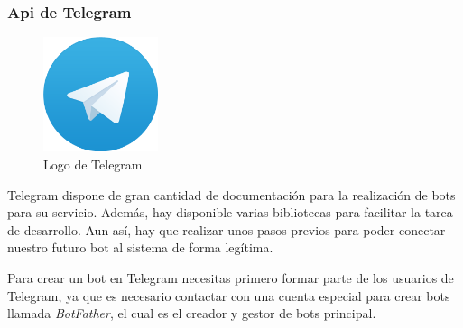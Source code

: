 \documentclass[spanish,12pt, a4paper, twoside]{paper}
\begin{document}
\subsubsection{Api de Telegram}

\begin{figure}
\centering
	\includegraphics[width=0.30\textwidth]{recursos/telegramlogo}
\caption{Logo de Telegram}
\label{fig:Logo de Telegram}
\end{figure}

Telegram dispone de gran cantidad de documentación para la realización de bots para su servicio. Además, hay disponible varias bibliotecas para facilitar la tarea de desarrollo. Aun así, hay que realizar unos pasos previos para poder conectar nuestro futuro bot al sistema de forma legítima.
\newline

Para crear un bot en Telegram necesitas primero formar parte de los usuarios de Telegram, ya que es necesario contactar con una cuenta especial para crear bots llamada \emph{BotFather}, el cual es el creador y gestor de bots principal.
\newline
\end{document}
